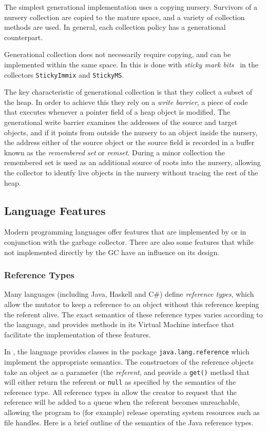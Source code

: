 The simplest generational implementation uses a copying nursery.  Survivors of 
a nursery collection are copied to the mature space, and a variety of collection
methods are used.  In general, each collection policy has a generational counterpart.

Generational collection does not necessarily require copying, and can be implemented
within the same space.  In \mmtk this is done with \emph{sticky mark bits}~\citep{Demers:1989}
in the collectors \lstinline|StickyImmix| and \lstinline|StickyMS|.

The key characteristic of generational collection is that they collect a subset
of the heap.  In order to achieve this they rely on a \emph{write barrier}, \ie a
piece of code that executes whenever a pointer field of a heap object is modified.
The generational write barrier examines the addresses of the source and target objects,
and if it points from outside the nursery to an object inside the nursery, the
address either of the source object or the source field is recorded in a buffer
known as the \emph{remembered set} or \emph{remset}.
During a minor collection the remembered set is used as an additional source of roots
into the nursery, allowing the collector to identfy live objects in the nursery
without tracing the rest of the heap.

\subsection{Language Features}

Modern programming languages offer features that are implemented by or in 
conjunction with the garbage collector.  There are also some features that 
while not implemented directly by the GC have an influence on its design.

\subsubsection{Reference Types}

Many languages (including Java, Haskell and C\#) define \emph{reference types}, which
allow the mutator to keep a reference to an object without this reference keeping
the referent alive.  The exact semantics of these reference types varies according
to the language, and \mmtk provides methods in its Virtual Machine interface that
facilitate the implementation of these features.  

In \java, the language provides classes in the package 
\lstinline|java.lang.reference|
which implement the appropriate semantics.  The constructors of the reference
objects take an object as a parameter (the \emph{referent}, 
and provide a \lstinline|get()| method
that will either return the referent or \lstinline|null| as specified by
the semantics of the reference type.
All reference types in \java allow the creator to request that the reference will
be added to a queue when the referent becomes unreachable, allowing the program
to (for example) release operating system resources such as file handles.
Here is a brief outline of the semantics of the Java reference types.

